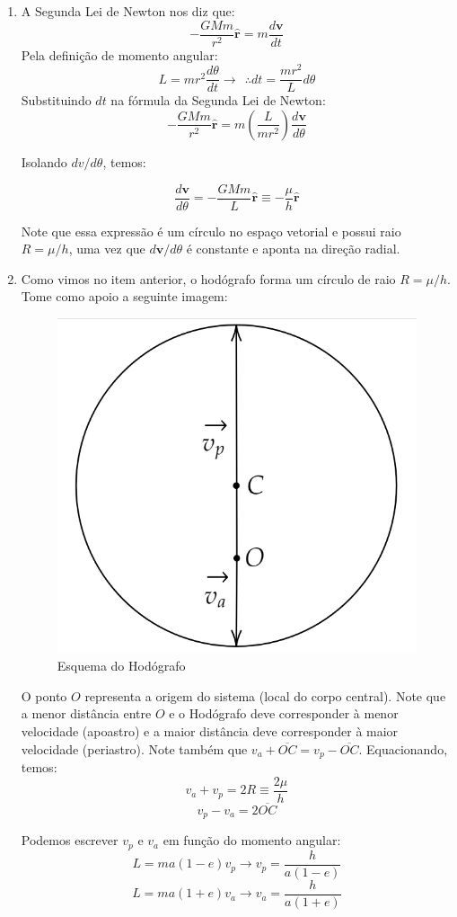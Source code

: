 \documentclass[11pt]{article}
\begin{document}
\begin{pproblem}
\begin{pssolution*}{}{}
        \begin{enumerate}[label=\textbf{\Roman*.}]
            \item A Segunda Lei de Newton nos diz que:
            \[-\frac{GMm}{r^2}\mathbf{\hat{r}} =  m\frac{d\mathbf{v}}{dt}\]
            Pela definição de momento angular:
            \[L = mr^2\frac{d\theta}{dt} \rightarrow \ \  \therefore dt = \frac{mr^2}{L}d\theta\]
            Substituindo \(dt\) na fórmula da Segunda Lei de Newton:
            \[-\frac{GMm}{r^2}\mathbf{\hat{r}} = m\left(\frac{L}{mr^2}\right)\frac{d\mathbf{v}}{d\theta}\]

            Isolando \(dv/d\theta\), temos:

            \[\boxed{\frac{d\mathbf{v}}{d\theta} = -\frac{GMm}{L}\mathbf{\hat{r}} \equiv -\frac{\mu}{h}\mathbf{\hat{r}}}\]

            Note que essa expressão é um círculo no espaço vetorial e possui raio \(R = \mu/h\), uma vez que \(d\mathbf{v}/d\theta\) é constante e aponta na direção radial.

            \item Como vimos no item anterior, o hodógrafo forma um círculo de raio \(R = \mu/h\). Tome como apoio a seguinte imagem:
            \begin{figure}[H]
                \centering
                \includegraphics[width=0.4\linewidth]{imagens/hodografo1.png}
                \caption{Esquema do Hodógrafo}
            \end{figure}
            O ponto \(O\) representa a origem do sistema (local do corpo central). Note que a menor distância entre \(O\) e o Hodógrafo deve corresponder à menor velocidade (apoastro) e a maior distância deve corresponder à maior velocidade (periastro). Note também que \(v_a + \overline{OC} = v_p - \overline{OC}\). Equacionando, temos:
            \[v_a + v_p = 2R \equiv \frac{2\mu}{h}\]
            \[v_p - v_a = 2\overline{OC}\]

            Podemos escrever \(v_p\) e \(v_a\) em função do momento angular:
            \[L = ma(1-e)v_p \rightarrow v_p = \frac{h}{a(1-e)}\]
            \[L = ma(1+e)v_a \rightarrow v_a = \frac{h}{a(1+e)}\]
            

\end{enumerate}
\end{pssolution*}
\end{pproblem}
\end{document}
